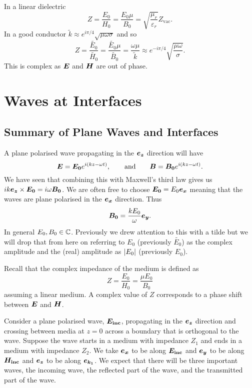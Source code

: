     In a linear dielectric
    \[Z = \frac{E_0}{H_0} = \frac{E_0\mu}{B_0} = \sqrt{\frac{\mu_r}{\varepsilon_r}}Z_{\text{vac}}.\]
    In a good conductor \(\tilde{k} \approx e^{i\pi/4}\sqrt{\mu\omega\sigma}\) and so
    \[Z = \frac{\tilde{E_0}}{\tilde{H_0}} = \frac{\tilde{E_0}\mu}{\tilde{B_0}} = \frac{\omega\mu}{\tilde{k}} \approx e^{-i\pi/4}\sqrt{\frac{\mu\omega}{\sigma}}.\]
    This is complex as \(\bm{E}\) and \(\bm{H}\) are out of phase.
    
    \section{Waves at Interfaces}
    \subsection{Summary of Plane Waves and Interfaces}
    A plane polarised wave propagating in the \(\bm{e_{z}}\) direction will have
    \[\bm{E} = \bm{E_0}e^{i(kz - \omega t)}, \qquad\text{and}\qquad \bm{B} = \bm{B_0}e^{i(kz - \omega t)}.\]
    We have seen that combining this with Maxwell's third law gives us \(ik\bm{e_{z}}\times\bm{E_0} = i\omega\bm{B_0}\).
    We are often free to choose \(\bm{E_0} = E_0\bm{e_{x}}\) meaning that the waves are plane polarised in the \(\bm{e_{x}}\) direction.
    Thus
    \[\bm{B_0} = \frac{kE_0}{\omega}\bm{e_{y}}.\]
    In general \(E_0, B_0\in\mathbb{C}\).
    Previously we drew attention to this with a tilde but we will drop that from here on referring to \(E_0\) (previously \(\tilde{E_0}\)) as the complex amplitude and the (real) amplitude as \(\abs{E_0}\) (previously \(E_0\)).
    
    Recall that the complex impedance of the medium is defined as
    \[Z = \frac{E_0}{H_0} = \frac{\mu E_0}{B_0}\]
    assuming a linear medium.
    A complex value of \(Z\) corresponds to a phase shift between \(\bm{E}\) and \(\bm{H}\).
    
    Consider a plane polarised wave, \(\bm{E_{\mathrm{inc}}}\), propagating in the \(\bm{e_{z}}\) direction and crossing between media at \(z = 0\) across a boundary that is orthogonal to the wave.
    Suppose the wave starts in a medium with impedance \(Z_1\) and ends in a medium with impedance \(Z_2\).
    We take \(\bm{e_{x}}\) to be along \(\bm{E_{\mathrm{inc}}}\) and \(\bm{e_{y}}\) to be along \(\bm{H_{\mathrm{inc}}}\) and \(\bm{e_{z}}\) to be along \(\bm{e_{k_1}}\).
    We expect that there will be three important waves, the incoming wave, the reflected part of the wave, and the transmitted part of the wave.
    
